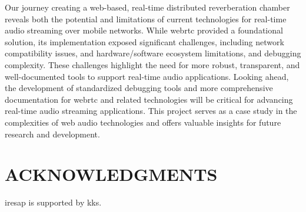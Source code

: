 \documentclass[fleqn]{jaes}
\begin{document}
Our journey creating a web-based, real-time distributed reverberation chamber reveals both the potential and limitations of current technologies for real-time audio streaming over mobile networks. While \gls{webrtc} provided a foundational solution, its implementation exposed significant challenges, including network compatibility issues, and hardware/software ecosystem limitations, and debugging complexity. These challenges highlight the need for more robust, transparent, and well-documented tools to support real-time audio applications. Looking ahead, the development of standardized debugging tools and more comprehensive documentation for \gls{webrtc} and related technologies will be critical for advancing real-time audio streaming applications. This project serves as a case study in the complexities of web audio technologies and offers valuable insights for future research and development.

\section{ACKNOWLEDGMENTS}
\gls{iresap} is supported by \gls{kks}.

% 






 
\end{document}
